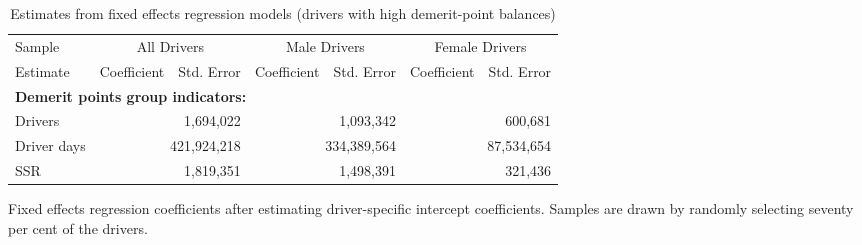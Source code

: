 
\begin{table}%
\centering 
\begin{tabular}{l r r r r r r} 

\hline 
 

Sample 
 & \multicolumn{2}{c}{All  Drivers}  & \multicolumn{2}{c}{Male  Drivers}  & \multicolumn{2}{c}{Female  Drivers}   \\ 
 

 \cmidrule(lr){1-1}\cmidrule(lr){2-3}\cmidrule(lr){4-5}\cmidrule(lr){6-7} 

Estimate  & Coefficient & Std. Error  & Coefficient & Std. Error  & Coefficient & Std. Error   \\ 
 

\hline 
 
\multicolumn{4}{l}{\textbf{Demerit points group indicators:}}  \\ 
 

\hline 
 

Drivers 
 & \multicolumn{2}{r}{1,694,022}  & \multicolumn{2}{r}{1,093,342}  & \multicolumn{2}{r}{600,681}   \\ 
 

Driver days 
 & \multicolumn{2}{r}{421,924,218}  & \multicolumn{2}{r}{334,389,564}  & \multicolumn{2}{r}{87,534,654}   \\ 
 

SSR 
 & \multicolumn{2}{r}{1,819,351}  & \multicolumn{2}{r}{1,498,391}  & \multicolumn{2}{r}{321,436}   \\ 
 

\hline 
 
\end{tabular} 
\caption{Estimates from fixed effects regression models (drivers with high demerit-point balances)} 
Fixed effects regression coefficients after estimating driver-specific intercept coefficients. 
Samples are drawn by randomly selecting seventy per cent of the drivers. 
\label{tab:FE_regs_high_pts} 
\end{table} 
 
